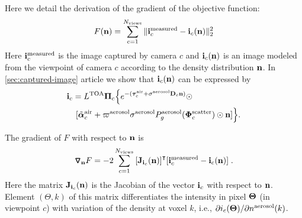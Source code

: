 \documentclass[10pt,letterpaper]{article}
\newcommand{\Grad}[1]{\bm{\triangledown_{#1}}}
\newcommand{\vect}[1]{\bm{#1}}
\newcommand{\transpose}[1]{{#1}^\intercal}
\begin{document}
Here we detail the derivation of the gradient of the objective
function:
\begin{equation}
  \label{eq:objectiveA}
  F({\bf n})
  = \sum_{c=1}^{N_{\rm views}}
  \| {\bf i}^{\rm measured}_c - {\bf i}_c({\bf n})\|^2_2
\end{equation}
Here ${\bf i}^{\rm measured}_c$ is the image captured by camera $c$
and ${\bf i}_c({\bf n})$ is an image modeled from the viewpoint of
camera $c$ according to the density distribution ${\bf n}$. In
\cref{sec:captured-image} article we show that ${\bf i}_c({\bf n})$
can be expressed by
\begin{align}
  {\bf i}_c= L^{\rm TOA} {\vect{\Pi}}_c \Big\{ e^{-(\vect{\tau}_c^{\rm
      air} + {\sigma}^{\rm aerosol} {\bf D}_c {\bf n}) }\odot
  \;\;\;\;\;\;\;\;\;\;\;\;\;\;\;\;\;\;\;\;\;
  \nonumber \\
  [\tilde{\vect{\alpha}}^{\rm air}_c + %
  \varpi^{\rm aerosol}\sigma^{\rm aerosol} P^{\rm
    aerosol}_g(\vect{\Phi}^{\rm scatter}_c) \odot{\bf n} ] \Big\} .
  \label{eq:bigIA}
\end{align}

The gradient of $F$ with respect to ${\bf n}$ is
\begin{align}
  \Grad{{\bf n}} F = -2\sum_{c=1}^{N_{\rm views}}
  \transpose{\left[{\bf J}_{{\bf i}_c}({\bf n})\right]} [{\bf i}^{\rm
    measured}_c - {\bf i}_c({\bf n})] \;.
  \label{eq:gradient1}
\end{align}
Here the matrix ${\bf J}_{{\bf i}_c}({\bf n})$ is the Jacobian of the
vector ${\bf i}_c$ with respect to ${\bf n}$. Element $(\Theta,k)$ of
this matrix differentiates the intensity in pixel ${\bf \Theta}$ (in
viewpoint $c$) with variation of the density at voxel $k$, i.e.,
$\partial i_c({\bf \Theta})/\partial{n^{\rm aerosol}(k)}$.
\end{document}
